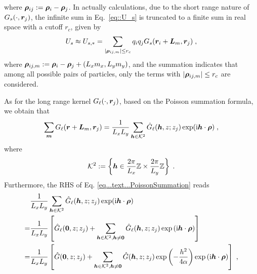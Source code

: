 where $\boldsymbol{\rho}_{ij}:=\bm{\rho}_i-\bm{\rho}_j$. 
In actually calculations, due to the short range nature of~$G_s(\cdot, \boldsymbol{r}_j)$, the infinite sum in Eq.~\eqref{eq::U_s} is truncated to a finite sum in real space with a cutoff $r_c$, given by
\begin{equation}\label{eq::U_s_truncated}
    U_s \approx U_{s, *} = \sum_{\lvert\bm{\rho}_{ij, m}\rvert \leq r_c} q_i q_j G_s(\boldsymbol{r}_i+\bm{L}_m, \boldsymbol{r}_j)\;,
\end{equation}
where $\bm{\rho}_{ij, m}:=\bm{\rho}_i-\bm{\rho}_j+ (L_x m_x, L_y m_y)$, and the summation indicates that among all possible pairs of particles, only the terms with $\lvert\bm{\rho}_{ij, m}\rvert \leq r_c$ are considered.


 As for the long  range kernel $ G_\ell(\cdot, \boldsymbol{r}_j)$, based on the Poisson summation formula, we obtain that 
\begin{equation}\label{eq...text...PoissonSummation}
 \sum_{\bm{m}}  G_\ell(\boldsymbol{r}+\bm{L}_m, \boldsymbol{r}_j)  =\frac{1}{ L_xL_y}   \sum_{\boldsymbol{h}\in\mathcal{K}^2} \Hat{G}_\ell(\boldsymbol{h},z;z_j)\exp(\textrm{i}\boldsymbol{h}\cdot \bm{\rho}) \;,
\end{equation}
where \[\mathcal{K}^2 := \left\{\boldsymbol{h} \in \frac{  2\pi}{L_x}\mathbb{Z}\times \frac{  2\pi}{L_y}\mathbb{Z} \right\}\;.\]
Furthermore, the RHS of Eq. \eqref{eq...text...PoissonSummation} reads
\begin{align*}
&\frac{1}{ L_xL_y}   \sum_{\boldsymbol{h}\in\mathcal{K}^2} \Hat{G}_\ell(\boldsymbol{h},z;z_j)\exp(\textrm{i}\boldsymbol{h}\cdot \bm{\rho})\\
=& \frac{1}{ L_xL_y}   \left[\Hat{G}_\ell(\bm{0}, z; z_j)+\sum_{\boldsymbol{h}\in\mathcal{K}^2,\boldsymbol{h}\neq\bm{0}}  \hat{G}_\ell(\boldsymbol{h}, z; z_j)\exp{(\mathrm{i} \boldsymbol{h} \cdot \boldsymbol{\rho})}\right]\\
=&\frac{1}{ L_xL_y}   \left[\hat{G}(\bm{0}, z; z_j)+\sum_{\boldsymbol{h}\in\mathcal{K}^2,\boldsymbol{h}\neq\bm{0}}  \hat{G}(\boldsymbol{h}, z; z_j)\exp\left(-\frac{h^2}{4\alpha}\right)\exp{(\mathrm{i} \boldsymbol{h} \cdot \boldsymbol{\rho})}\right]\;,
\end{align*}
